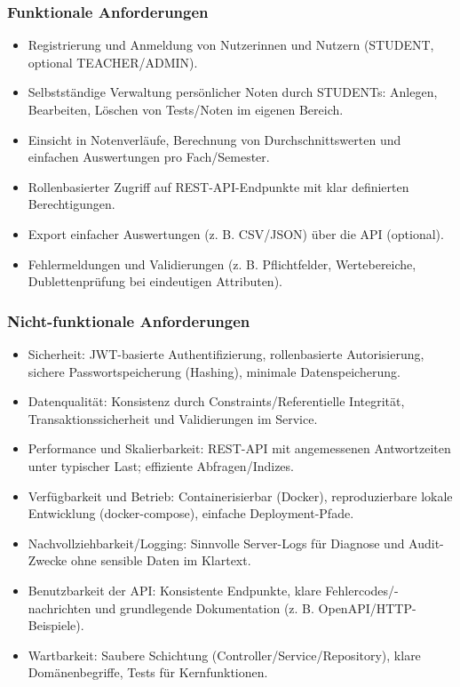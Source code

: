 \documentclass[12pt,a4paper]{article}
\begin{document}
    \subsubsection{Funktionale Anforderungen}
    \begin{itemize}
        \item Registrierung und Anmeldung von Nutzerinnen und Nutzern (STUDENT, optional TEACHER/ADMIN).
        \item Selbstständige Verwaltung persönlicher Noten durch STUDENTs: Anlegen, Bearbeiten, Löschen von Tests/Noten im eigenen Bereich.
        \item Einsicht in Notenverläufe, Berechnung von Durchschnittswerten und einfachen Auswertungen pro Fach/Semester.
        \item Rollenbasierter Zugriff auf REST-API-Endpunkte mit klar definierten Berechtigungen.
        \item Export einfacher Auswertungen (z. B. CSV/JSON) über die API (optional).
        \item Fehlermeldungen und Validierungen (z. B. Pflichtfelder, Wertebereiche, Dublettenprüfung bei eindeutigen Attributen).
    \end{itemize}

    \subsubsection{Nicht-funktionale Anforderungen}
    \begin{itemize}
        \item Sicherheit: JWT-basierte Authentifizierung, rollenbasierte Autorisierung, sichere Passwortspeicherung (Hashing), minimale Datenspeicherung.
        \item Datenqualität: Konsistenz durch Constraints/Referentielle Integrität, Transaktionssicherheit und Validierungen im Service.
        \item Performance und Skalierbarkeit: REST-API mit angemessenen Antwortzeiten unter typischer Last; effiziente Abfragen/Indizes.
        \item Verfügbarkeit und Betrieb: Containerisierbar (Docker), reproduzierbare lokale Entwicklung (docker-compose), einfache Deployment-Pfade.
        \item Nachvollziehbarkeit/Logging: Sinnvolle Server-Logs für Diagnose und Audit-Zwecke ohne sensible Daten im Klartext.
        \item Benutzbarkeit der API: Konsistente Endpunkte, klare Fehlercodes/-nachrichten und grundlegende Dokumentation (z. B. OpenAPI/HTTP-Beispiele).
        \item Wartbarkeit: Saubere Schichtung (Controller/Service/Repository), klare Domänenbegriffe, Tests für Kernfunktionen.
    \end{itemize}
\end{document}
